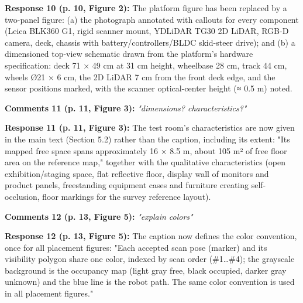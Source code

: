 \documentclass[11pt]{article}
\begin{document}
\textbf{Response 10 (p. 10, Figure 2):} The platform figure has been replaced by a two-panel figure: (a) the photograph annotated with callouts for every component (Leica BLK360 G1, rigid scanner mount, YDLiDAR TG30 2D LiDAR, RGB-D camera, deck, chassis with battery/controllers/BLDC skid-steer drive); and (b) a dimensioned top-view schematic drawn from the platform's hardware specification: deck 71 × 49 cm at 31 cm height, wheelbase 28 cm, track 44 cm, wheels Ø21 × 6 cm, the 2D LiDAR 7 cm from the front deck edge, and the sensor positions marked, with the scanner optical-center height (≈ 0.5 m) noted.

\medskip

\textbf{Comments 11 (p. 11, Figure 3):} \emph{"dimensions? characteristics?"}

\textbf{Response 11 (p. 11, Figure 3):} The test room's characteristics are now given in the main text (Section 5.2) rather than the caption, including its extent: "Its mapped free space spans approximately 16 × 8.5 m, about 105 m² of free floor area on the reference map," together with the qualitative characteristics (open exhibition/staging space, flat reflective floor, display wall of monitors and product panels, freestanding equipment cases and furniture creating self-occlusion, floor markings for the survey reference layout).

\medskip

\textbf{Comments 12 (p. 13, Figure 5):} \emph{"explain colors"}

\textbf{Response 12 (p. 13, Figure 5):} The caption now defines the color convention, once for all placement figures: "Each accepted scan pose (marker) and its visibility polygon share one color, indexed by scan order (\#1…\#4); the grayscale background is the occupancy map (light gray free, black occupied, darker gray unknown) and the blue line is the robot path. The same color convention is used in all placement figures."

\medskip
\end{document}
